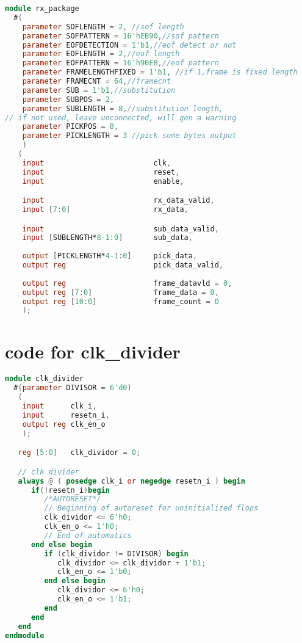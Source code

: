 \documentclass{article}
\begin{document}
\begin{lstlisting}[language=Verilog]
module rx_package
  #(   
    parameter SOFLENGTH = 2, //sof length
    parameter SOFPATTERN = 16'hEB90,//sof pattern
    parameter EOFDETECTION = 1'b1,//eof detect or not
    parameter EOFLENGTH = 2,//eof length
    parameter EOFPATTERN = 16'h90EB,//eof pattern
    parameter FRAMELENGTHFIXED = 1'b1, //if 1,frame is fixed length
    parameter FRAMECNT = 64,//framecnt
    parameter SUB = 1'b1,//substitution
    parameter SUBPOS = 2,
    parameter SUBLENGTH = 8,//substitution length,
// if not used, leave unconnected, will gen a warning   
    parameter PICKPOS = 8,
    parameter PICKLENGTH = 3 //pick some bytes output
    )
   (
    input                         clk,
    input                         reset,
    input                         enable,

    input                         rx_data_valid,
    input [7:0]                   rx_data, 

    input                         sub_data_valid, 
    input [SUBLENGTH*8-1:0]       sub_data,
   
    output [PICKLENGTH*4-1:0]     pick_data,
    output reg                    pick_data_valid,
   
    output reg                    frame_datavld = 0, 
    output reg [7:0]              frame_data = 0,
    output reg [10:0]             frame_count = 0
    );
\end{lstlisting}





\section{code for clk\_divider}
\begin{lstlisting}[language=Verilog]
module clk_divider
  #(parameter DIVISOR = 6'd0)   
   (
    input      clk_i,
    input      resetn_i,
    output reg clk_en_o
    );

   reg [5:0]   clk_dividor = 0;   

   // clk divider
   always @ ( posedge clk_i or negedge resetn_i ) begin
      if(!resetn_i)begin
         /*AUTORESET*/
         // Beginning of autoreset for uninitialized flops
         clk_dividor <= 6'h0;
         clk_en_o <= 1'h0;
         // End of automatics
      end else begin
         if (clk_dividor != DIVISOR) begin
            clk_dividor <= clk_dividor + 1'b1;
            clk_en_o <= 1'b0;
         end else begin
            clk_dividor <= 6'h0;
            clk_en_o <= 1'b1;
         end
      end      
   end
endmodule
\end{lstlisting}
\end{document}
